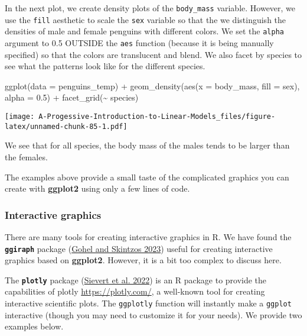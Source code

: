 \documentclass[
]{book}
\newenvironment{Shaded}{\begin{snugshade}}{\end{snugshade}}
\newcommand{\AttributeTok}[1]{\textcolor[rgb]{0.77,0.63,0.00}{#1}}
\newcommand{\FloatTok}[1]{\textcolor[rgb]{0.00,0.00,0.81}{#1}}
\newcommand{\FunctionTok}[1]{\textcolor[rgb]{0.00,0.00,0.00}{#1}}
\newcommand{\NormalTok}[1]{#1}
\newcommand{\SpecialCharTok}[1]{\textcolor[rgb]{0.00,0.00,0.00}{#1}}
\theoremstyle{definition}
\theoremstyle{definition}
\theoremstyle{definition}
\theoremstyle{definition}
\theoremstyle{remark}
\begin{document}
In the next plot, we create density plots of the \texttt{body\_mass} variable. However, we use the \texttt{fill} aesthetic to scale the \texttt{sex} variable so that the we distinguish the densities of male and female penguins with different colors. We set the \texttt{alpha} argument to 0.5 OUTSIDE the \texttt{aes} function (because it is being manually specified) so that the colors are translucent and blend. We also facet by species to see what the patterns look like for the different species.

\begin{Shaded}
\begin{Highlighting}[]
\FunctionTok{ggplot}\NormalTok{(}\AttributeTok{data =}\NormalTok{ penguins\_temp) }\SpecialCharTok{+}
  \FunctionTok{geom\_density}\NormalTok{(}\FunctionTok{aes}\NormalTok{(}\AttributeTok{x =}\NormalTok{ body\_mass, }\AttributeTok{fill =}\NormalTok{ sex), }\AttributeTok{alpha =} \FloatTok{0.5}\NormalTok{) }\SpecialCharTok{+}
  \FunctionTok{facet\_grid}\NormalTok{(}\SpecialCharTok{\textasciitilde{}}\NormalTok{ species)}
\end{Highlighting}
\end{Shaded}

\texttt{[image: A-Progessive-Introduction-to-Linear-Models\_files/figure-latex/unnamed-chunk-85-1.pdf]}

We see that for all species, the body mass of the males tends to be larger than the females.

The examples above provide a small taste of the complicated graphics you can create with \textbf{ggplot2} using only a few lines of code.

\hypertarget{interactive-graphics}{%
\subsubsection{Interactive graphics}\label{interactive-graphics}}

There are many tools for creating interactive graphics in R. We have found the \textbf{\texttt{ggiraph}} package (\protect\hyperlink{ref-R-ggiraph}{Gohel and Skintzos 2023}) useful for creating interactive graphics based on \textbf{ggplot2}. However, it is a bit too complex to discuss here.

The \textbf{\texttt{plotly}} package (\protect\hyperlink{ref-R-plotly}{Sievert et al. 2022}) is an R package to provide the capabilities of plotly \url{https://plotly.com/}, a well-known tool for creating interactive scientific plots. The \texttt{ggplotly} function will instantly make a \texttt{ggplot} interactive (though you may need to customize it for your needs). We provide two examples below.
\end{document}
